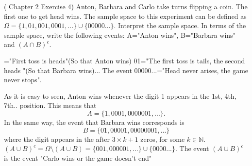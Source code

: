 \documentclass[12pt]{article}
\newcommand{\<}{{\langle \!\! \langle}}
\renewcommand{\>}{{\rangle \!\! \rangle}}
\begin{document}
\begin{ExerciseList}
\Exercise (\cite{Ross} Chapter 2 Exercise 4)
Anton, Barbara  and Carlo take turns flipping a coin. The first one to get head wins. The sample space to this experiment can be defined as $\Omega=\{1,01,001,0001,...\}\cup\{00000...\}$.
\Question Interpret the sample space.
\Question In terms of the sample space, write the following events: A="Anton wins", B="Barbara wins" and $(A\cap B)^c$.

\Answer {}="First toss is heads"(So that Anton wins)  01="The first toss is tails, the second heads "(So that Barbara wins)... The event 00000...="Head never arises, the game never stops". 

	\Question As it is easy to seen, Anton wins whenever the digit 1 appears in the 1st, 4th, 7th.. position. This means that 
$$
A=\{1,0001,0000001,...\}.
$$
In the same way, the event that Barbara wins corresponds is 
$$B=\{01,00001,00000001,...\}$$
where the digit appears in the after $3\times k+1$ zeros, for some $k\in\mathbb{N}$.
 $(A\cup B)^c=\Omega\setminus(A\cup B)=\{001,000001,...\}\cup\{0000...\}$.
The event $(A\cup B)^c$ is the event "Carlo wins or the game doesn't end"  

\end{ExerciseList}
\end{document}
